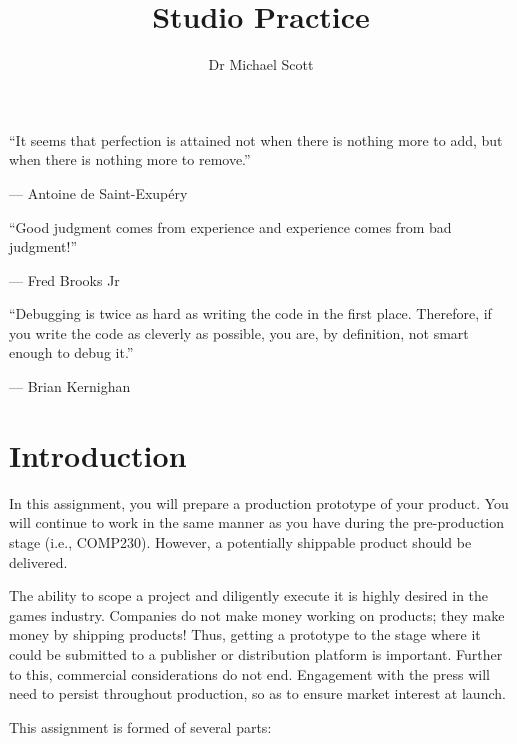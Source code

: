 \documentclass{../../fal_assignment}
\title{Studio Practice}
\author{Dr Michael Scott}
\begin{document}
\maketitle

\begin{marginquote}
    ``It seems that perfection is attained not when there is nothing more to add,
        but when there is nothing more to remove.''
    
    --- Antoine de Saint-Exup\'ery
    
    \marginquoterule
    
    ``Good judgment comes from experience and experience comes from bad judgment!''
    
    --- Fred Brooks Jr
    
    \marginquoterule
    
    ``Debugging is twice as hard as writing the code in the first place.
     Therefore, if you write the code as cleverly as possible, you are, by definition, not smart enough to debug it.'' 
 
         --- Brian Kernighan
     
\end{marginquote}

\section*{Introduction}

In this assignment, you will prepare a production prototype of your product. You will continue to work in the same manner as you have during the pre-production stage (i.e., COMP230). However, a potentially shippable product should be delivered.

The ability to scope a project and diligently execute it is highly desired in the games industry. Companies do not make money working on products; they make money by shipping products! Thus, getting a prototype to the stage where it could be submitted to a publisher or distribution platform is important. Further to this, commercial considerations do not end. Engagement with the press will need to persist throughout production, so as to ensure market interest at launch.

This assignment is formed of several parts:
\end{document}
